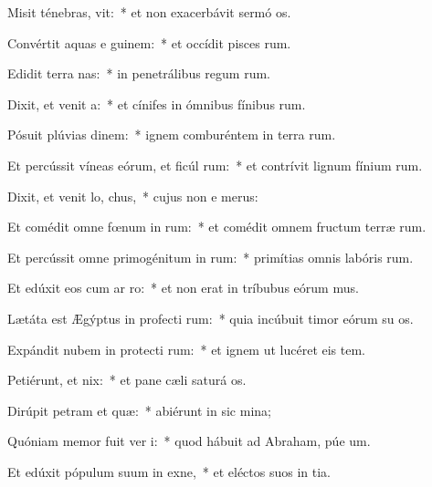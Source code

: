 \item Misit ténebras,  vit:~* et non exacerbávit sermó os.
\item Convértit aquas e  guinem:~* et occídit pisces rum.
\item Edidit terra  nas:~* in penetrálibus regum rum.
\item Dixit, et venit a:~* et cínifes in ómnibus fínibus rum.
\item Pósuit plúvias  dinem:~* ignem comburéntem in terra rum.
\item Et percússit víneas eórum, et ficúl rum:~* et contrívit lignum fínium rum.
\item Dixit, et venit lo,  chus,~* cujus non e merus:
\item Et comédit omne fœnum in  rum:~* et comédit omnem fructum terræ rum.
\item Et percússit omne primogénitum in  rum:~* primítias omnis labóris rum.
\item Et edúxit eos cum ar  ro:~* et non erat in tríbubus eórum mus.
\item Lætáta est Ægýptus in profecti rum:~* quia incúbuit timor eórum su os.
\item Expándit nubem in protecti rum:~* et ignem ut lucéret eis  tem.
\item Petiérunt, et  nix:~* et pane cæli saturá os.
\item Dirúpit petram et  quæ:~* abiérunt in sic mina;
\item Quóniam memor fuit ver  i:~* quod hábuit ad Abraham, púe um.
\item Et edúxit pópulum suum in exne,~* et eléctos suos in tia.
